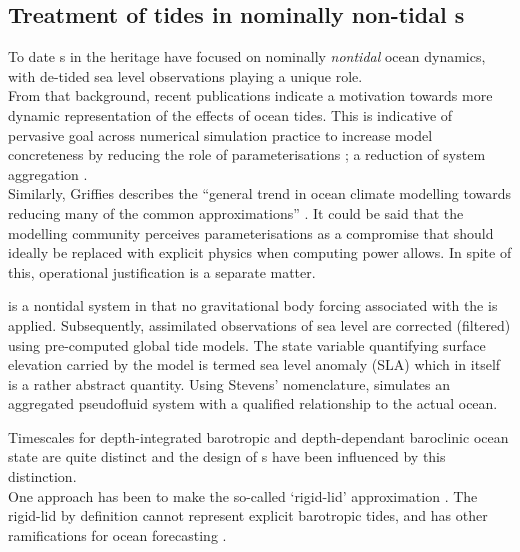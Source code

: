  
\subsection{Treatment of tides in nominally non-tidal \OGCM{}s}
\label{S:tides_ogcm}
To date \OGCM{}s in the \GODAE{} heritage have focused on nominally \emph{nontidal} ocean dynamics, with de-tided sea level observations playing a unique role.\\


From that background, recent publications indicate a motivation towards more dynamic representation of the effects of ocean tides.   This is indicative of pervasive goal across numerical simulation practice to increase model concreteness by reducing the role of parameterisations \cite[section 5.3]{Petersen:2012tr}; a reduction of system aggregation \citep{Stevens:2001kb}.\\
Similarly, Griffies describes the ``general trend in ocean climate modelling towards reducing many of the common approximations'' \citep[pp20] {Griffies:2004vs}.
It could be said that the modelling community perceives parameterisations as a compromise that should ideally be replaced with explicit physics when computing power allows.  In spite of this, operational justification is a separate matter.



\BL{} is a nontidal system in that no gravitational body forcing associated with the \ATGP{} is applied.   Subsequently, assimilated observations of sea level are corrected (filtered) using pre-computed global tide models.  The state variable quantifying surface elevation carried by the model is termed sea level anomaly (SLA) which in itself is a rather abstract quantity. Using Stevens' nomenclature, \BL{} simulates an aggregated pseudofluid system with a qualified relationship to the actual ocean.


Timescales for depth-integrated barotropic and depth-dependant baroclinic ocean state are quite distinct and the design of \OGCM{}s have been influenced by this distinction. \\
One approach has been to make the so-called `rigid-lid' approximation \cite[pp128]{gill1982atmosphere}. 
The rigid-lid by definition cannot represent explicit barotropic tides, and has other ramifications for ocean forecasting \cite[pp19]{Griffies:2004vs}.\\


